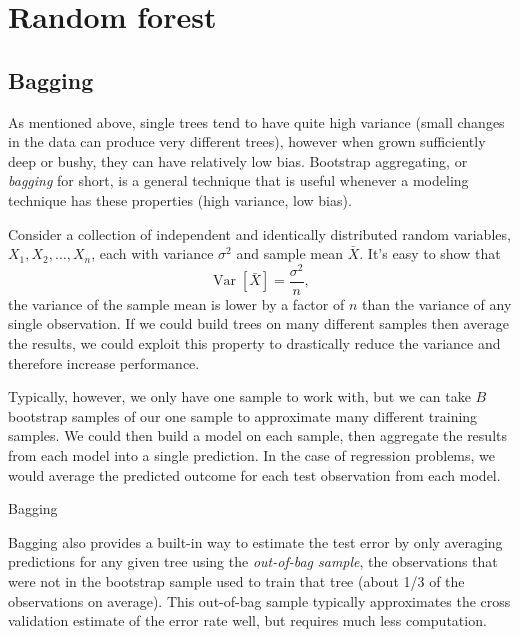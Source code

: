 \documentclass[12pt]{article}
\begin{document}
\section{Random forest} %
\label{sec:random_forest}

\subsection{Bagging} %
\label{sub:bagging}

As mentioned above, single trees tend to have quite high variance (small changes in the data can produce very different trees), however when grown sufficiently deep or bushy, they can have relatively low bias. Bootstrap aggregating, or \emph{bagging} for short, is a general technique that is useful whenever a modeling technique has these properties (high variance, low bias).

Consider a collection of independent and identically distributed random variables, $X_{1}, X_{2}, \ldots, X_{n}$, each with variance $\sigma^2$ and sample mean $\bar{X}$. It's easy to show that
\begin{equation}
  \operatorname{Var}[\bar{X}] = \frac{\sigma^2}{n},
\end{equation}
the variance of the sample mean is lower by a factor of $n$ than the variance of any single observation. If we could build trees on many different samples then average the results, we could exploit this property to drastically reduce the variance and therefore increase performance.

Typically, however, we only have one sample to work with, but we can take $B$ bootstrap samples of our one sample to approximate many different training samples. We could then build a model on each sample, then aggregate the results from each model into a single prediction. In the case of regression problems, we would average the predicted outcome for each test observation from each model.

\begin{algorithm}[ht]
 \caption{Bagging}
\end{algorithm}

Bagging also provides a built-in way to estimate the test error by only averaging predictions for any given tree using the \emph{out-of-bag sample}, the observations that were not in the bootstrap sample used to train that tree (about 1/3 of the observations on average). This out-of-bag sample typically approximates the cross validation estimate of the error rate well, but requires much less computation.
\end{document}
